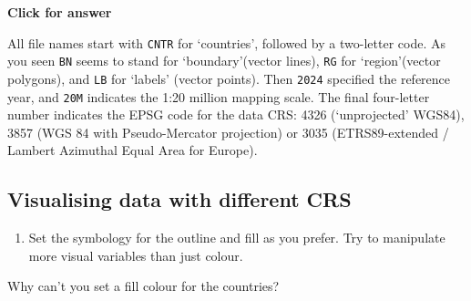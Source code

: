 \documentclass[
  letterpaper,
  DIV=11,
  numbers=noendperiod]{scrreprt}
\providecommand{\tightlist}{%
  \setlength{\itemsep}{0pt}\setlength{\parskip}{0pt}}\usepackage{longtable,booktabs,array}
\begin{document}
\begin{tcolorbox}[enhanced jigsaw, toprule=.15mm, breakable, left=2mm, colframe=quarto-callout-important-color-frame, colback=white, arc=.35mm, leftrule=.75mm, opacityback=0, rightrule=.15mm, bottomrule=.15mm]

\vspace{-3mm}\textbf{Click for answer}\vspace{3mm}

All file names start with \texttt{CNTR} for `countries', followed by a
two-letter code. As you seen \texttt{BN} seems to stand for
`boundary'(vector lines), \texttt{RG} for `region'(vector polygons), and
\texttt{LB} for `labels' (vector points). Then \texttt{2024} specified
the reference year, and \texttt{20M} indicates the 1:20 million mapping
scale. The final four-letter number indicates the EPSG code for the data
CRS: 4326 (`unprojected' WGS84), 3857 (WGS 84 with Pseudo-Mercator
projection) or 3035 (ETRS89-extended / Lambert Azimuthal Equal Area for
Europe).

\end{tcolorbox}

\subsection{Visualising data with different
CRS}\label{visualising-data-with-different-crs}

\begin{enumerate}
\def\labelenumi{(\arabic{enumi})}
\setcounter{enumi}{48}
\tightlist
\item
  Set the symbology for the outline and fill as you prefer. Try to
  manipulate more visual variables than just colour.
\end{enumerate}

\begin{tcolorbox}[enhanced jigsaw, coltitle=black, toprule=.15mm, breakable, opacitybacktitle=0.6, left=2mm, colback=white, leftrule=.75mm, rightrule=.15mm, colbacktitle=quarto-callout-important-color!10!white, toptitle=1mm, titlerule=0mm, colframe=quarto-callout-important-color-frame, arc=.35mm, bottomtitle=1mm, opacityback=0, bottomrule=.15mm, title=\textcolor{quarto-callout-important-color}{\faExclamation}\hspace{0.5em}{Stop and Think}]

Why can't you set a fill colour for the countries?

\end{tcolorbox}
\end{document}
